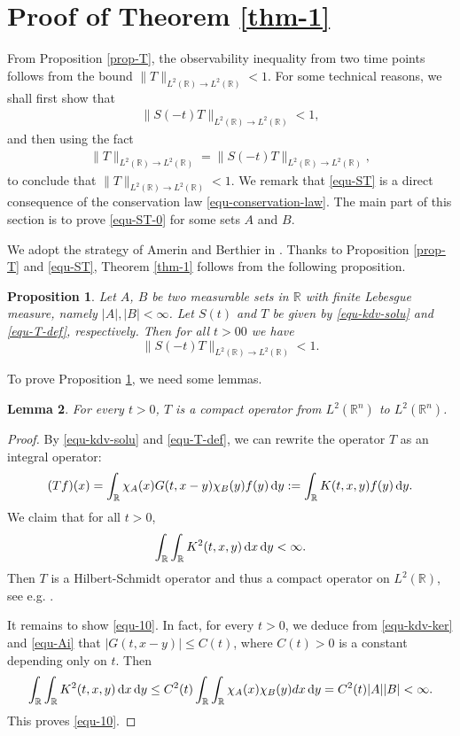\documentclass[12pt]{amsart}
\def\R {\mathbb{R}}
\def\d{{\,\rm d}}
\newtheorem{proposition}{Proposition}[section]
\newtheorem{lemma}[proposition]{Lemma}
\theoremstyle{definition}
\newtheorem{remark}[proposition]{Remark}
\numberwithin{equation}{section}
\begin{document}





\section{Proof of Theorem \ref{thm-1}}

From Proposition \ref{prop-T}, the observability inequality from two time points follows from the bound $\|T\|_{L^2(\R)\to L^2(\R)}< 1$. For some technical reasons, we shall first show that
\begin{align}\label{equ-ST-0}
\|S(-t)T\|_{L^2(\R)\to L^2(\R)}<1,
\end{align}
and then using the fact
\begin{align}\label{equ-ST}
\|T\|_{L^2(\R)\to L^2(\R)}=\|S(-t)T\|_{L^2(\R)\to L^2(\R)},
\end{align}
to conclude that $\|T\|_{L^2(\R)\to L^2(\R)}< 1$. We remark that \eqref{equ-ST} is a direct consequence of  the conservation law \eqref{equ-conservation-law}. The main part of this section is to prove \eqref{equ-ST-0} for some sets $A$ and $B$.

We adopt the strategy of Amerin and Berthier in \cite{Amrein}. Thanks to Proposition \ref{prop-T} and \eqref{equ-ST}, Theorem  \ref{thm-1} follows from the following proposition.
\begin{proposition}\label{prop-3}
Let $A$, $B$ be two measurable sets in $\R$ with finite Lebesgue measure, namely $|A|,|B|<\infty$. Let $S(t)$ and $T$ be given by \eqref{equ-kdv-solu} and \eqref{equ-T-def}, respectively. Then for all $t>0 0$ we have
$$
\|S(-t)T\|_{L^2(\R)\to L^2(\R)}<1.
$$
\end{proposition}

To prove Proposition \ref{prop-3}, we need some lemmas.

\begin{lemma}\label{lem-T-comp}
For every $t>0$, $T$ is a compact operator from $L^2(\R^n)$ to $L^2(\R^n)$.
\end{lemma}
\begin{proof}
By \eqref{equ-kdv-solu} and \eqref{equ-T-def}, we can rewrite the operator $T$ as an integral operator:
$$
(Tf)(x)=\int_{\R }\chi_A(x)G(t,x-y)\chi_B(y)f(y)\d y:=\int_{\R } K(t,x,y)f(y)\d y.
$$
We claim that for all $t>0$,
\begin{align}\label{equ-10}
 \int_{\R }\int_{\R } K^2(t,x,y)\d x \d y<\infty.
\end{align}
Then $T$ is a Hilbert-Schmidt operator and thus a compact operator on $L^2(\R )$, see e.g. \cite[p.277]{Yosida}.

It remains to show \eqref{equ-10}. In fact, for every $t>0$, we deduce from \eqref{equ-kdv-ker} and \eqref{equ-Ai} that $|G(t,x-y)|\leq C(t)$, where $C(t)>0$ is a constant depending only on $t$. Then
\begin{align*}
 \int_\R\int_\R K^2(t,x,y)\d x \d y\leq  C^2(t) \int_\R\int_\R \chi_A(x)\chi_B(y)d x \d y=C^2(t)|A||B|<\infty.
\end{align*}
This proves \eqref{equ-10}.
\end{proof}
\end{document}
